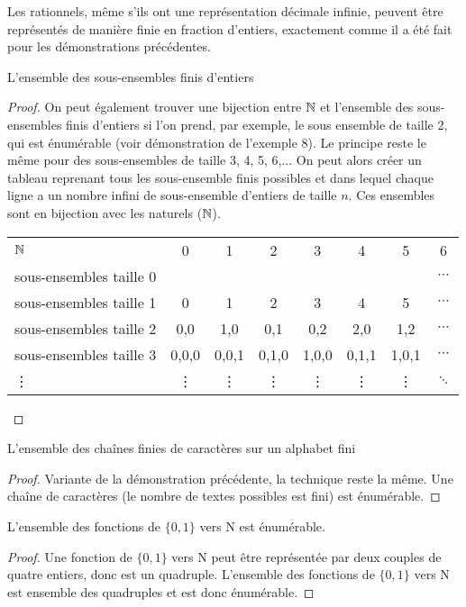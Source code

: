 \begin{myexem}
 Les rationnels, même s'ils ont une représentation décimale infinie, peuvent être représentés de manière finie en fraction d'entiers, exactement comme il a été fait pour les démonstrations précédentes.
 \end{myexem}
  
\begin{myexem}  
  L'ensemble des sous-ensembles finis d'entiers
  \begin{proof}
  On peut également trouver une bijection entre $\mathbb{N}$ et l'ensemble des sous-ensembles finis d'entiers si l'on prend, par exemple, le sous ensemble de taille 2, qui est énumérable (voir démonstration de l'exemple 8). Le principe reste le même pour des sous-ensembles de taille 3, 4, 5, 6,... On peut alors créer un tableau reprenant tous les sous-ensemble finis possibles et dans lequel chaque ligne a un nombre infini de sous-ensemble d'entiers de taille $n$. Ces ensembles sont en bijection avec les naturels ($\mathbb{N}$).
  
    \begin{tabular}{ l c c  c  c c c  c }
 	 $\mathbb{N}$ & 0 & 1 & 2  & 3 & 4 & 5 & 6  \\
 	 sous-ensembles  taille 0  & {} & {} & {} & {} & {} & {}  & $\cdots$ \\
 	 sous-ensembles  taille 1  & {0} & {1} & {2} & {3} & {4} & {5} & $\cdots$ \\
 	 sous-ensembles  taille 2  & {0,0} & {1,0} & {0,1} & {0,2} & {2,0} & {1,2}  & $\cdots$ \\
 	 sous-ensembles  taille 3  & {0,0,0} & {0,0,1} & {0,1,0} & {1,0,0} & {0,1,1} & {1,0,1}  & $\cdots$ \\
 	 \vdots  & {\vdots} & {\vdots} & {\vdots} & {\vdots} & {\vdots} & {\vdots}  & $\ddots$ \\
	\end{tabular}
  \end{proof}
\end{myexem}

\begin{myexem}  
  L'ensemble des chaînes finies de caractères sur un alphabet fini
\begin{proof}
 Variante de la démonstration précédente, la technique reste la même. Une chaîne de caractères (le nombre de textes possibles est fini) est énumérable.  
\end{proof}
\end{myexem}

\begin{myexem}
 L'ensemble des fonctions de  $\{0, 1\}$ vers N est énumérable.
 \begin{proof}
  Une fonction de $\{0, 1\}$ vers N peut être représentée par deux couples de quatre entiers, donc est un quadruple. L'ensemble des fonctions de $\{0, 1\}$ vers N est ensemble des quadruples et est donc énumérable.
 \end{proof}
\end{myexem}
 
